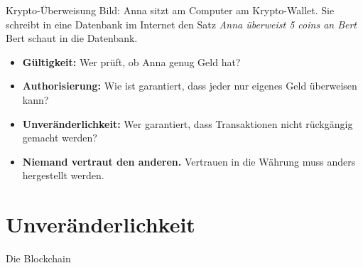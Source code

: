 \documentclass[aspectratio=169]{beamer}
\begin{document}
\begin{frame}{Krypto-Überweisung}
    Bild: Anna sitzt am Computer am Krypto-Wallet. Sie schreibt in eine Datenbank im Internet den Satz \emph{Anna überweist 5 coins an Bert} Bert schaut in die Datenbank.

    \pause
    \begin{itemize}
        \item \textbf{Gültigkeit:} Wer prüft, ob Anna genug Geld hat?
        \item \textbf{Authorisierung:} Wie ist garantiert, dass jeder nur eigenes Geld überweisen kann?
        \item \textbf{Unveränderlichkeit:} Wer garantiert, dass Transaktionen nicht rückgängig gemacht werden?
    \end{itemize}

    \vfill
    \begin{itemize}
        \item \textbf{Niemand vertraut den anderen.} Vertrauen in die Währung muss anders hergestellt werden.
    \end{itemize}
\end{frame}


\section{Unveränderlichkeit}

\begin{frame}[fragile]{Die Blockchain}
    \begin{center}
        \hspace{1cm}
        \hspace{1cm}
    \end{center}
\end{frame}
\end{document}
